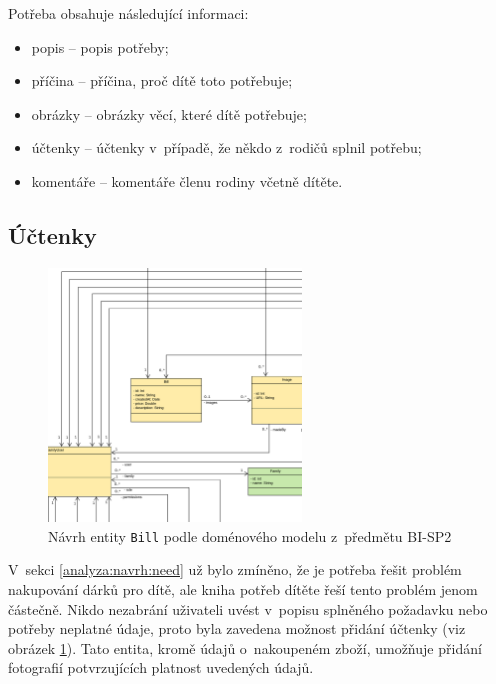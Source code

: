        Potřeba obsahuje následující informaci:
        \begin{itemize}
            \item popis -- popis potřeby;
            \item příčina -- příčina, proč dítě toto potřebuje;
            \item obrázky -- obrázky věcí, které dítě potřebuje;
            \item účtenky -- účtenky v~případě, že někdo z~rodičů splnil potřebu;
            \item komentáře -- komentáře členu rodiny včetně dítěte.
        \end{itemize}
    
    \subsection{Účtenky}
        \begin{figure}\centering
	        \includegraphics[width=0.6\textwidth]{pdfs/Bill1}
	        \caption[Návrh entity \texttt{Bill}]{Návrh entity \texttt{Bill} podle doménového modelu z~předmětu BI-SP2}\label{image:bill1}
        \end{figure}
        V~sekci \ref{analyza:navrh:need} už bylo zmíněno, že je potřeba řešit problém nakupování dárků pro dítě, ale kniha potřeb dítěte řeší tento problém jenom částečně. Nikdo nezabrání uživateli uvést v~popisu splněného požadavku nebo potřeby neplatné údaje, proto byla zavedena možnost přidání účtenky (viz obrázek \ref{image:bill1}). Tato entita, kromě údajů o~nakoupeném zboží, umožňuje přidání fotografií potvrzujících platnost uvedených údajů.
    
